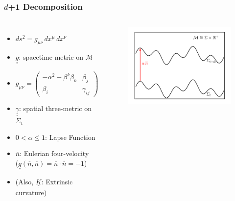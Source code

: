 \documentclass{beamer}
\newcommand{\ul}{\underline}
\newcommand{\ol}{\overline}
\begin{document}
\begin{frame}
\frametitle{$d$+1 Decomposition}

  \begin{columns}[c]


      \begin{itemize}[<+->]
        \item[]
          $ds^{2}=g_{\mu\nu}\,dx^{\mu}\,dx^{\nu}$\\[1em]
        \item[]
          $\ul{\ul{g}}$: spacetime metric on $\mathcal{M}$\\[1em]
        \item[]
          $g_{\mu\nu}
            =\begin{pmatrix}
             -\alpha^{2}+\beta^{k}\beta_{k} & \beta_{j} \\[1em]
             \beta_{i}   & \gamma_{ij}
             \end{pmatrix}$\\[1em]
        \item[]
          $\ul{\ul{\gamma}}$: spatial three-metric on $\Sigma_{t}$\\[1em]
        \item[]
          $0<\alpha\leq1$: Lapse Function\\[1em]
        \item[]
          $\ol{n}$: Eulerian four-velocity\\[1em]
          ($\ul{\ul{g}}\left(\ol{n},\ol{n}\right)=\ol{n}\cdot\ol{n}=-1$)\\[1em]
        \item[]
          (Also, $\ul{\ul{K}}$: Extrinsic curvature)
      \end{itemize}


      \begin{figure}[htb!]
        \centering
        \includegraphics[width=\textwidth]{1+1a.png}
      \end{figure}

  \end{columns}

\end{frame}
\end{document}

